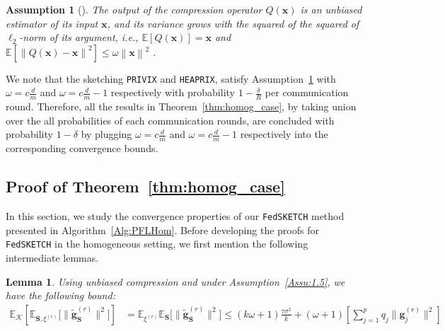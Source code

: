 \documentclass[sigconf, anonymous, review]{acmart}
\newtheorem{lemma}{Lemma}
\newtheorem{assumption}{Assumption}
\begin{document}
\begin{assumption}[\citep{haddadpour2020federated}]\label{Assu:quant}
The output of the compression operator $Q(\boldsymbol{x})$ is an unbiased estimator of its input $\boldsymbol{x}$, and its variance grows with the squared of the squared of $\ell_2$-norm of its argument, i.e., $\mathbb{E}\left[Q(\boldsymbol{x})\right]=\boldsymbol{x}$ and $\mathbb{E}\left[\left\|Q(\boldsymbol{x})-\boldsymbol{x}\right\|^2\right]\leq \omega\left\|\boldsymbol{x}\right\|^2$ .
\end{assumption}
We note that the sketching \texttt{PRIVIX} and \texttt{HEAPRIX}, satisfy Assumption~\ref{Assu:quant} with $\omega=c \frac{d}{m}$ and $\omega=c\frac{d}{m}-1$ respectively with probability $1-\frac{\delta}{R}$ per communication round. 
Therefore, all the results in Theorem~\ref{thm:homog_case}, by taking union over the all probabilities of each communication rounds, are concluded with probability $1-\delta$  by plugging $\omega=c\frac{d}{m}$ and $\omega=c\frac{d}{m}-1$ respectively into the corresponding convergence bounds.

\subsection{Proof of Theorem~\ref{thm:homog_case}}

In this section, we study the convergence properties of our \texttt{FedSKETCH} method presented in Algorithm~\ref{Alg:PFLHom}. 
Before developing the proofs for \texttt{FedSKETCH} in the homogeneous setting, we first mention the following intermediate lemmas. 


\begin{lemma}\label{lemma:tasbih1-iid}
Using unbiased compression and under Assumption~\ref{Assu:1.5}, we have the following bound: 
\begin{align}
\mathbb{E}_{\mathcal{K}}\left[\mathbb{E}_{{\mathbf{S},\xi^{(r)}}}\Big[\|\tilde{\mathbf{g}}_{\mathbf{S}}^{(r)}\|^2\Big]\right]&=\mathbb{E}_{{\xi}^{(r)}}\mathbb{E}_{\mathbf{S}}\Big[\|\tilde{\mathbf{g}}_\mathbf{S}^{(r)}\|^2\Big]\leq (k\omega+1)\frac{\tau\sigma^2}{k}+(\omega+1)\left[\sum_{j=1}^pq_j\|{\mathbf{g}}_{j}^{(r)}\|^2\right] \label{eq:lemma1}
\end{align}
\end{lemma}
\end{document}
